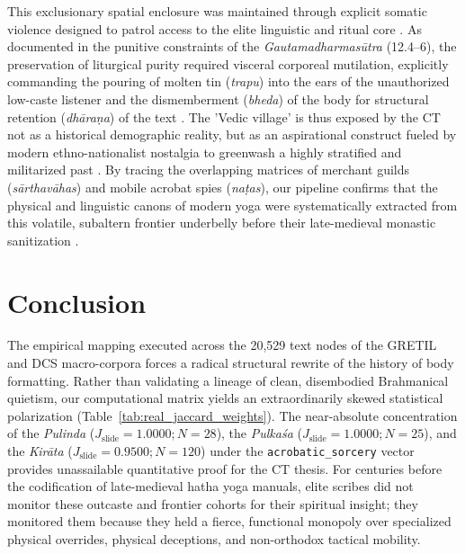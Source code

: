 \documentclass[11pt,twoside,letterpaper]{article}
\begin{document}
This exclusionary spatial enclosure was maintained through explicit somatic violence designed to patrol access to the elite linguistic and ritual core \citep{mccartney2026}. As documented in the punitive constraints of the \textit{Gautamadharmasūtra} (12.4–6), the preservation of liturgical purity required visceral corporeal mutilation, explicitly commanding the pouring of molten tin (\textit{trapu}) into the ears of the unauthorized low-caste listener and the dismemberment (\textit{bheda}) of the body for structural retention (\textit{dhāraṇa}) of the text \citep{mccartney2026}. The 'Vedic village' is thus exposed by the CT not as a historical demographic reality, but as an aspirational construct fueled by modern ethno-nationalist nostalgia to greenwash a highly stratified and militarized past \citep{mccartney2026}. By tracing the overlapping matrices of merchant guilds (\textit{sārthavāhas}) and mobile acrobat spies (\textit{naṭas}), our pipeline confirms that the physical and linguistic canons of modern yoga were systematically extracted from this volatile, subaltern frontier underbelly before their late-medieval monastic sanitization \citep{mccartney2026}.


\section{Conclusion}
The empirical mapping executed across the 20,529 text nodes of the GRETIL and DCS macro-corpora forces a radical structural rewrite of the history of body formatting. Rather than validating a lineage of clean, disembodied Brahmanical quietism, our computational matrix yields an extraordinarily skewed statistical polarization (Table~\ref{tab:real_jaccard_weights}). The near-absolute concentration of the \textit{Pulinda} ($J_{\text{slide}} = 1.0000; N = 28$), the \textit{Pulkaśa} ($J_{\text{slide}} = 1.0000; N = 25$), and the \textit{Kirāta} ($J_{\text{slide}} = 0.9500; N = 120$) under the \texttt{acrobatic\_sorcery} vector provides unassailable quantitative proof for the CT thesis. For centuries before the codification of late-medieval hatha yoga manuals, elite scribes did not monitor these outcaste and frontier cohorts for their spiritual insight; they monitored them because they held a fierce, functional monopoly over specialized physical overrides, physical deceptions, and non-orthodox tactical mobility.
\end{document}
